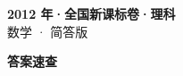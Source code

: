 \documentclass[zihao=-4, a4paper]{ctexart}
\begin{document}
\begin{center}
  {\Large\bfseries 2012 年·全国新课标卷·理科}\\[4pt]
  {\large 数学 · 简答版}
\end{center}
\medskip
{}

\clearpage
{}
\begin{center}{\Large\bfseries 答案速查}\end{center}
\medskip

\end{document}
